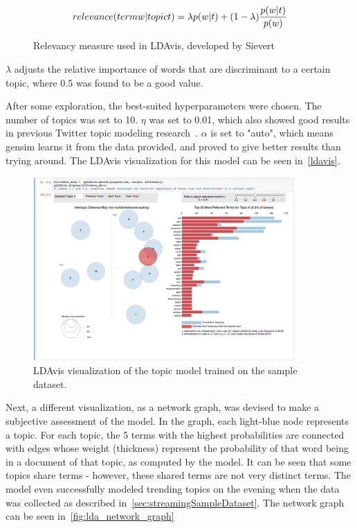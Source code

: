 \begin{figure}
    \caption{Relevancy measure used in LDAvis, developed by Sievert \etAl~\cite{sievert2014ldavis}}
    \label{math:relevance}
    \begin{align*}
        relevance(term w | topic t) = \lambda \* p(w | t) + (1 - \lambda) \* \frac{p(w | t)}{p(w)}
    \end{align*}
\end{figure}

$\lambda$ adjusts the relative importance of words that are discriminant to a certain topic,
where 0.5 was found to be a good value.

After some exploration, the best-suited hyperparameters were chosen.
The number of topics was set to 10.
$\eta$ was set to 0.01, which also showed good results in previous Twitter topic modeling research~\cite{Hong2010}.
$\alpha$ is set to "auto", which means gensim learns it from the data provided, and proved to give better results than trying around.
The LDAvis visualization for this model can be seen in~\ref{ldavis}.

\begin{figure}
    \centering
    \caption{LDAvis visualization of the topic model trained on the sample dataset.}
    \label{fig:ldavis}
    \includegraphics[width=10cm]{../images/LDAvis.png}
\end{figure}

\par
Next, a different visualization, as a network graph, was devised to make a subjective assessment of the model.
In the graph, each light-blue node represents a topic.
For each topic, the 5 terms with the highest probabilities are connected with edges whose weight (thickness) represent the probability
of that word being in a document of that topic, as computed by the model.
It can be seen that some topics share terms - however, these shared terms are not very distinct terms.
The model even successfully modeled trending topics on the evening when the data was collected as described in~\ref{sec:streamingSampleDataset}.
The network graph can be seen in~\ref{fig:lda_network_graph}

